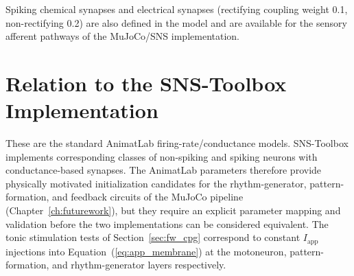 Spiking chemical synapses and electrical synapses (rectifying coupling weight 0.1, non-rectifying 0.2) are also defined in the model and are available for the sensory afferent pathways of the MuJoCo/SNS implementation.

\section{Relation to the SNS-Toolbox Implementation}

These are the standard AnimatLab firing-rate/conductance models. SNS-Toolbox \citep{nourse_sns_2023} implements corresponding classes of non-spiking and spiking neurons with conductance-based synapses. The AnimatLab parameters therefore provide physically motivated initialization candidates for the rhythm-generator, pattern-formation, and feedback circuits of the MuJoCo pipeline (Chapter~\ref{ch:futurework}), but they require an explicit parameter mapping and validation before the two implementations can be considered equivalent. The tonic stimulation tests of Section~\ref{sec:fw_cpg} correspond to constant $I_{\text{app}}$ injections into Equation~(\ref{eq:app_membrane}) at the motoneuron, pattern-formation, and rhythm-generator layers respectively.

